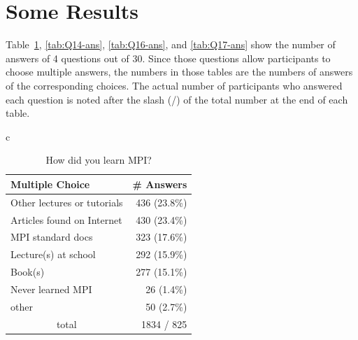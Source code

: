 \documentclass[sigconf,nonacm]{acmart}
\begin{document}
\section{Some Results}

Table~\ref{tab:Q10-ans}, \ref{tab:Q14-ans}, \ref{tab:Q16-ans}, and
\ref{tab:Q17-ans} show the number of answers of 4 questions out of
30. Since those questions allow participants to choose multiple answers, 
the numbers in those tables are the numbers of answers of the
corresponding choices. The actual number of participants who answered
each question is noted after the slash (/) of the total number
at the end of each table.  

\begin{table}[htb]%
\scriptsize
\begin{center}%
\begin{tabular}{c}

\begin{minipage}{0.24\hsize}
\begin{center}%
\caption{\small How did you learn MPI?}%
\label{tab:Q10-ans}%
\begin{tabular}{l|r}%
\hline%
Multiple Choice & \# Answers \\%
\hline%
Other lectures or tutorials & 436 (23.8\%) \\%
Articles found on Internet & 430 (23.4\%) \\%
MPI standard docs & 323 (17.6\%) \\%
Lecture(s) at school & 292 (15.9\%) \\%
Book(s) & 277 (15.1\%) \\%
Never learned MPI & 26 (1.4\%) \\%
other & 50 (2.7\%) \\%
\hline%
\multicolumn{1}{c}{total} & 1834 / 825 \\%
\hline%
\end{tabular}%
\end{center}%
\end{minipage}


\end{tabular}
\end{center}
\end{table}
\end{document}
